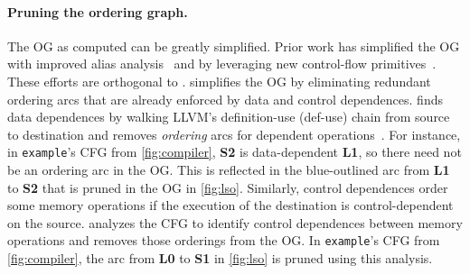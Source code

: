 \paragraph{Pruning the ordering graph.} 
The OG as computed can be greatly simplified.
% 
Prior work has simplified the OG with improved alias analysis~\cite{hind-aa} and by leveraging new control-flow primitives~\cite{midkiff-padua,doacross}.
% 
These efforts are orthogonal to \riptidecomp.
% 
\riptidecomp simplifies the OG by eliminating redundant
ordering arcs that are already enforced by data and control dependences.
%
% 
\riptidecomp finds data dependences by walking LLVM's definition-use (def-use)
chain from source to destination and removes \emph{ordering} arcs for dependent operations~\cite{nachos}.
%
For instance, in \texttt{example}'s CFG from \autoref{fig:compiler}, 
\textbf{S2} is data-dependent \textbf{L1}, so there need not
be an ordering arc in the OG. This is reflected in the blue-outlined arc
from \textbf{L1} to \textbf{S2} that is pruned in the OG in \autoref{fig:lso}.
%
Similarly, control dependences order some memory operations if the execution of
the destination is control-dependent on the source.
%
%
\riptidecomp analyzes the CFG to identify control dependences
between memory operations and removes those orderings from the OG.
%
In \texttt{example}'s CFG from \autoref{fig:compiler}, the
arc from \textbf{L0} to \textbf{S1} in \autoref{fig:lso} is pruned using this analysis.

\figRipTideLSO

